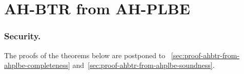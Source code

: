 \section{AH-BTR from AH-PLBE}\label{sec:ahbtr-from-ahplbe}



\subsubsection{Security.}
The proofs of the theorems below are postponed to \Sections~\ref{sec:proof-ahbtr-from-ahplbe-completeness} and~\ref{sec:proof-ahbtr-from-ahplbe-soundness}.


